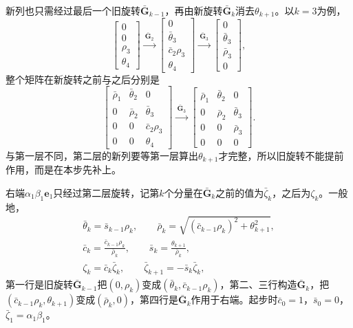 新列也只需经过最后一个旧旋转$\bar{\bm G}_{k-1}$，再由新旋转$\bar{\bm G}_k$消去$\theta_{k+1}$。以$k=3$为例，
\[
 \begin{bmatrix}0\\0\\\rho_3\\\theta_4\end{bmatrix}
 \xrightarrow{\ \bar{\bm G}_2\ }
 \begin{bmatrix}0\\\bar\theta_3\\\bar c_2\rho_3\\\theta_4\end{bmatrix}
 \xrightarrow{\ \bar{\bm G}_3\ }
 \begin{bmatrix}0\\\bar\theta_3\\\bar\rho_3\\0\end{bmatrix},
\]
整个矩阵在新旋转之前与之后分别是
\[
 \begin{bmatrix}
 \bar\rho_1&\bar\theta_2&0\\
 0&\bar\rho_2&\bar\theta_3\\
 0&0&\bar c_2\rho_3\\
 0&0&\theta_4
 \end{bmatrix}
 \xrightarrow{\ \bar{\bm G}_3\ }
 \begin{bmatrix}
 \bar\rho_1&\bar\theta_2&0\\
 0&\bar\rho_2&\bar\theta_3\\
 0&0&\bar\rho_3\\
 0&0&0
 \end{bmatrix}.
\]
与第一层不同，第二层的新列要等第一层算出$\theta_{k+1}$才完整，所以旧旋转不能提前作用，而是在本步先补上。

右端$\alpha_1\beta_1\bm e_1$只经过第二层旋转，记第$k$个分量在$\bar{\bm G}_k$之前的值为$\bar\zeta_k$，之后为$\zeta_k$。一般地，
\begin{equation}
 \begin{gathered}
 \bar\theta_k=\bar s_{k-1}\rho_k,\qquad
 \bar\rho_k=\sqrt{(\bar c_{k-1}\rho_k)^2+\theta_{k+1}^2},\\
 \bar c_k=\frac{\bar c_{k-1}\rho_k}{\bar\rho_k},\qquad
 \bar s_k=\frac{\theta_{k+1}}{\bar\rho_k},\\
 \zeta_k=\bar c_k\bar\zeta_k,\qquad
 \bar\zeta_{k+1}=-\bar s_k\bar\zeta_k ,
 \end{gathered}
 \label{eq:ls-lsmr-second-rotation}
\end{equation}
第一行是旧旋转$\bar{\bm G}_{k-1}$把$(0,\rho_k)$变成$(\bar\theta_k,\bar c_{k-1}\rho_k)$，第二、三行构造$\bar{\bm G}_k$，把$(\bar c_{k-1}\rho_k,\theta_{k+1})$变成$(\bar\rho_k,0)$，第四行是$\bar{\bm G}_k$作用于右端。起步时$\bar c_0=1$，$\bar s_0=0$，$\bar\zeta_1=\alpha_1\beta_1$。

